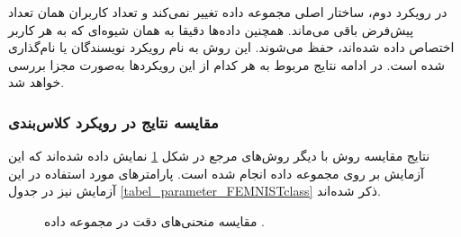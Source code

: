 در رویکرد دوم، ساختار اصلی مجموعه داده تغییر نمی‌کند و تعداد کاربران همان تعداد پیش‌فرض باقی می‌ماند. همچنین داده‌ها دقیقا به همان شیوه‌ای که به هر کاربر اختصاص داده شده‌اند، حفظ می‌شوند. این روش به نام رویکرد نویسندگان یا
نام‌گذاری شده است. در ادامه نتایج مربوط به هر کدام از این رویکرد‌ها به‌صورت مجزا بررسی خواهد شد.


\vspace{3mm}
\subsubsection{
	مقایسه نتایج در رویکرد کلاس‌بندی
}\vspace{-1mm}

نتایج مقایسه روش
با دیگر روش‌های مرجع در شکل
\ref{result_FEMNISTclass}
نمایش داده شده‌اند که این آزمایش بر روی مجموعه داده
انجام شده است. پارامترهای مورد استفاده در این آزمایش نیز در جدول
\ref{tabel_parameter_FEMNISTclass}
ذکر شده‌اند.


\begin{figure}[b!]
	\centering
	\hspace{0.8mm}
	\caption{
		مقایسه منحنی‌های دقت در مجموعه داده
		.
	}
	\label{result_FEMNISTclass}
\end{figure}


